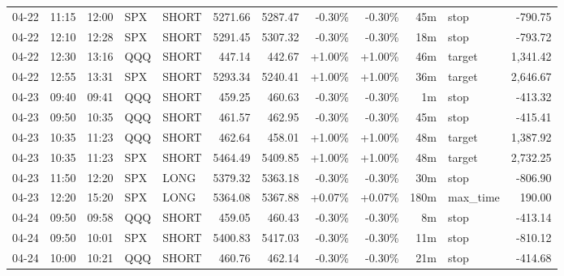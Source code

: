 \documentclass[11pt,a4paper,twoside]{article}
\begin{document}
\begin{center}
\begin{longtable}{>{\color{txtmain}}l l l l l r r r r r >{\color{txtmain}}l r}
04-22 & 11:15 & 12:00 & SPX & SHORT & 5271.66 & 5287.47 & \textcolor{lossred}{-0.30\%} & \textcolor{lossred}{-0.30\%} & 45m & stop & \textcolor{lossred}{-790.75} \\
04-22 & 12:10 & 12:28 & SPX & SHORT & 5291.45 & 5307.32 & \textcolor{lossred}{-0.30\%} & \textcolor{lossred}{-0.30\%} & 18m & stop & \textcolor{lossred}{-793.72} \\
04-22 & 12:30 & 13:16 & QQQ & SHORT & 447.14 & 442.67 & \textcolor{wingreen}{+1.00\%} & \textcolor{wingreen}{+1.00\%} & 46m & target & \textcolor{wingreen}{1,341.42} \\
04-22 & 12:55 & 13:31 & SPX & SHORT & 5293.34 & 5240.41 & \textcolor{wingreen}{+1.00\%} & \textcolor{wingreen}{+1.00\%} & 36m & target & \textcolor{wingreen}{2,646.67} \\
04-23 & 09:40 & 09:41 & QQQ & SHORT & 459.25 & 460.63 & \textcolor{lossred}{-0.30\%} & \textcolor{lossred}{-0.30\%} & 1m & stop & \textcolor{lossred}{-413.32} \\
04-23 & 09:50 & 10:35 & QQQ & SHORT & 461.57 & 462.95 & \textcolor{lossred}{-0.30\%} & \textcolor{lossred}{-0.30\%} & 45m & stop & \textcolor{lossred}{-415.41} \\
04-23 & 10:35 & 11:23 & QQQ & SHORT & 462.64 & 458.01 & \textcolor{wingreen}{+1.00\%} & \textcolor{wingreen}{+1.00\%} & 48m & target & \textcolor{wingreen}{1,387.92} \\
04-23 & 10:35 & 11:23 & SPX & SHORT & 5464.49 & 5409.85 & \textcolor{wingreen}{+1.00\%} & \textcolor{wingreen}{+1.00\%} & 48m & target & \textcolor{wingreen}{2,732.25} \\
04-23 & 11:50 & 12:20 & SPX & LONG & 5379.32 & 5363.18 & \textcolor{lossred}{-0.30\%} & \textcolor{lossred}{-0.30\%} & 30m & stop & \textcolor{lossred}{-806.90} \\
04-23 & 12:20 & 15:20 & SPX & LONG & 5364.08 & 5367.88 & \textcolor{wingreen}{+0.07\%} & \textcolor{wingreen}{+0.07\%} & 180m & max\_time & \textcolor{wingreen}{190.00} \\
04-24 & 09:50 & 09:58 & QQQ & SHORT & 459.05 & 460.43 & \textcolor{lossred}{-0.30\%} & \textcolor{lossred}{-0.30\%} & 8m & stop & \textcolor{lossred}{-413.14} \\
04-24 & 09:50 & 10:01 & SPX & SHORT & 5400.83 & 5417.03 & \textcolor{lossred}{-0.30\%} & \textcolor{lossred}{-0.30\%} & 11m & stop & \textcolor{lossred}{-810.12} \\
04-24 & 10:00 & 10:21 & QQQ & SHORT & 460.76 & 462.14 & \textcolor{lossred}{-0.30\%} & \textcolor{lossred}{-0.30\%} & 21m & stop & \textcolor{lossred}{-414.68} \\

\end{longtable}
\end{center}
\end{document}
